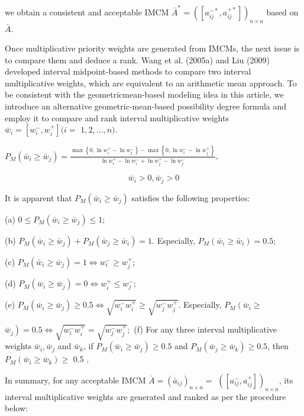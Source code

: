 \documentclass[10pt]{article}
\begin{document}
we obtain a consistent and acceptable IMCM $\bar{A}^{*}=\left(\left[a_{i j}^{-*}, a_{i j}^{+*}\right]\right)_{n \times n}$ based on $\bar{A}$.

Once multiplicative priority weights are generated from IMCMs, the next issue is to compare them and deduce a rank. Wang et al. (2005a) and Liu (2009) developed interval midpoint-based methods to compare two interval multiplicative weights, which are equivalent to an arithmetic mean approach. To be consistent with the geometricmean-based modeling idea in this article, we introduce an alternative geometric-mean-based possibility degree formula and employ it to compare and rank interval multiplicative weights $\bar{w}_{i}=\left[w_{i}^{-}, w_{i}^{+}\right](i=$ $1,2, \ldots, n)$.

$P_{M}\left(\bar{w}_{i} \geq \bar{w}_{j}\right)=\frac{\max \left\{0, \ln w_{i}^{+}-\ln w_{j}^{-}\right\}-\max \left\{0, \ln w_{i}^{-}-\ln w_{j}^{+}\right\}}{\ln w_{i}^{+}-\ln w_{i}^{-}+\ln w_{j}^{+}-\ln w_{j}^{-}}$,

$$
\bar{w}_{i}>0, \bar{w}_{j}>0
$$

It is apparent that $P_{M}\left(\bar{w}_{i} \geq \bar{w}_{j}\right)$ satisfies the following properties:

(a) $0 \leq P_{M}\left(\bar{w}_{i} \geq \bar{w}_{j}\right) \leq 1$;

(b) $P_{M}\left(\bar{w}_{i} \geq \bar{w}_{j}\right)+P_{M}\left(\bar{w}_{j} \geq \bar{w}_{i}\right)=1$. Especially, $P_{M}\left(\bar{w}_{i} \geq \bar{w}_{i}\right)=0.5$;

(c) $P_{M}\left(\bar{w}_{i} \geq \bar{w}_{j}\right)=1 \Leftrightarrow w_{i}^{-} \geq w_{j}^{+}$;

(d) $P_{M}\left(\bar{w}_{i} \geq \bar{w}_{j}\right)=0 \Leftrightarrow w_{i}^{+} \leq w_{j}^{-}$;

(e) $P_{M}\left(\bar{w}_{i} \geq \bar{w}_{j}\right) \geq 0.5 \Leftrightarrow \sqrt{w_{i}^{-} w_{i}^{+}} \geq \sqrt{w_{j}^{-} w_{j}^{+}}$. Especially, $P_{M}\left(\bar{w}_{i} \geq\right.$

$\left.\bar{w}_{j}\right)=0.5 \Leftrightarrow \sqrt{w_{i}^{-} w_{i}^{+}}=\sqrt{w_{j}^{-} w_{j}^{+}} ;$
(f) For any three interval multiplicative weights $\bar{w}_{i}, \bar{w}_{j}$ and $\bar{w}_{k}$, if $P_{M}\left(\bar{w}_{i} \geq \bar{w}_{j}\right) \geq 0.5$ and $P_{M}\left(\bar{w}_{j} \geq \bar{w}_{k}\right) \geq 0.5$, then $P_{M}\left(\bar{w}_{i} \geq \bar{w}_{k}\right) \geq$ 0.5 .

In summary, for any acceptable IMCM $\bar{A}=\left(\bar{a}_{i j}\right)_{n \times n}=$ $\left(\left[a_{i j}^{-}, a_{i j}^{+}\right]\right)_{n \times n}$, its interval multiplicative weights are generated and ranked as per the procedure below:
\end{document}
